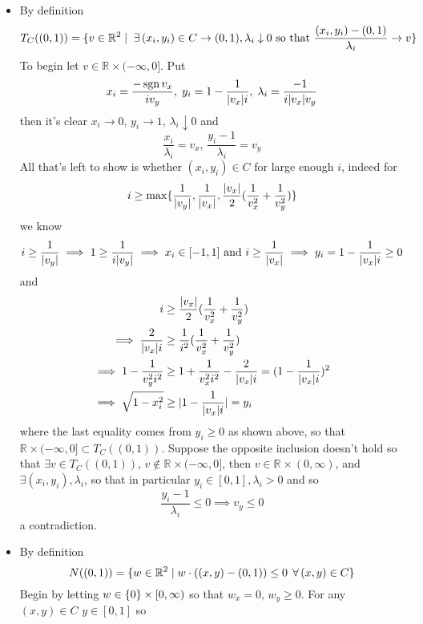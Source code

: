 \documentclass{article}
\newenvironment{ex}[1]
  {\renewcommand\theexercise{#1}\exercise}
  {\endexercise}
\DeclareMathOperator*{\sgn}{sgn}
\newcommand{\R}[1]{\mathbb{R}^{#1}}
\begin{document}
\begin{ex}{7.9} %
  \begin{itemize} \, \\
    \item
      By definition
      $$
      T_C((0, 1)) = \braces{ v \in \R{2} \mid \exists (x_i, y_i) \in C \to (0, 1), \lambda_i \downarrow 0 \text{ so that } \frac{(x_i, y_i) - (0, 1)}{\lambda_i} \to v }
      $$
      To begin let $v \in \R{} \times (-\infty, 0]$. Put
      $$
      x_i = \frac{-\sgn v_x}{i v_y}, \; y_i = 1 - \frac{1}{\abs{v_x} i}, \; \lambda_i = \frac{-1}{i \abs{v_x} v_y}
      $$
      then it's clear $x_i \to 0, \, y_i \to 1, \, \lambda_i \downarrow 0$ and
      $$
      \frac{x_i}{\lambda_i} = v_x, \, \frac{y_i - 1}{\lambda_i} = v_y
      $$
      All that's left to show is whether $(x_i, y_i) \in C$ for large enough $i$, indeed for
      $$
      i \ge \max\{ \frac{1}{\lvert v_y\rvert}, \frac{1}{\lvert v_x\rvert}, \frac{\lvert v_x\rvert}{2}(\frac{1}{v_x^2} + \frac{1}{v_y^2}) \}
      $$
      we know
      $$
      i \ge \frac{1}{\lvert v_y\rvert} \implies 1 \ge \frac{1}{i\lvert v_y\rvert} \implies x_i \in [-1, 1] \text{ and } i \ge \frac{1}{\lvert v_x\rvert} \implies y_i = 1 - \frac{1}{\lvert v_x\rvert i} \ge 0
      $$
      and
      \begin{align*}
        i &\ge \frac{\lvert v_x\rvert}{2}(\frac{1}{v_x^2} + \frac{1}{v_y^2}) \\
        \implies \frac{2}{\lvert v_x\rvert i} &\ge \frac{1}{i^2} ( \frac{1}{v_x^2} + \frac{1}{v_y^2} ) \\
        \implies 1 - \frac{1}{v_y^2 i^2} &\ge 1 + \frac{1}{v_x^2 i^2} - \frac{2}{\lvert v_x\rvert i} = (1 - \frac{1}{\lvert v_x\rvert i})^2 \\
        \implies \sqrt{1 - x_i^2} &\ge \lvert1 - \frac{1}{\lvert v_x\rvert i}\rvert = y_i
      \end{align*}
      where the last equality comes from $y_i \ge 0$ as shown above, so that $\R{} \times (-\infty, 0] \subset T_C((0, 1))$. Suppose the opposite inclusion doesn't hold so that $\exists v \in T_C((0, 1)), \, v \not\in \R{} \times (-\infty, 0]$, then $v \in \R{} \times (0, \infty)$, and $\exists (x_i, y_i), \lambda_i$, so that in particular $y_i \in [0, 1], \lambda_i > 0$ and so
      $$
      \frac{y_i - 1}{\lambda_i} \le 0 \implies v_y \le 0
      $$
      a contradiction.
    \item
      By definition
      $$
      N((0, 1)) = \braces{ w \in \R{2} \mid w \cdot ((x, y) - (0, 1)) \le 0 \, \forall (x, y) \in C }
      $$
      Begin by letting $w \in \{0\} \times [0, \infty)$ so that $w_x = 0, \, w_y \ge 0$. For any $(x, y) \in C$ $y \in [0, 1]$ so

\end{itemize}
\end{ex}
\end{document}
